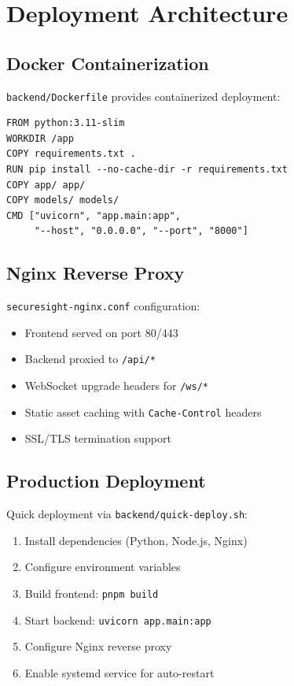 \documentclass[conference]{IEEEtran}
\begin{document}
\section{Deployment Architecture}

\subsection{Docker Containerization}
\texttt{backend/Dockerfile} provides containerized deployment:
\begin{verbatim}
FROM python:3.11-slim
WORKDIR /app
COPY requirements.txt .
RUN pip install --no-cache-dir -r requirements.txt
COPY app/ app/
COPY models/ models/
CMD ["uvicorn", "app.main:app", 
     "--host", "0.0.0.0", "--port", "8000"]
\end{verbatim}

\subsection{Nginx Reverse Proxy}
\texttt{securesight-nginx.conf} configuration:
\begin{itemize}
    \item Frontend served on port 80/443
    \item Backend proxied to \texttt{/api/*}
    \item WebSocket upgrade headers for \texttt{/ws/*}
    \item Static asset caching with \texttt{Cache-Control} headers
    \item SSL/TLS termination support
\end{itemize}

\subsection{Production Deployment}
Quick deployment via \texttt{backend/quick-deploy.sh}:
\begin{enumerate}
    \item Install dependencies (Python, Node.js, Nginx)
    \item Configure environment variables
    \item Build frontend: \texttt{pnpm build}
    \item Start backend: \texttt{uvicorn app.main:app}
    \item Configure Nginx reverse proxy
    \item Enable systemd service for auto-restart
\end{enumerate}
\end{document}

